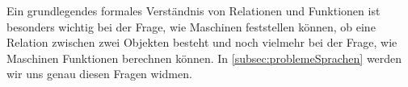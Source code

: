 Ein grundlegendes formales Verständnis von Relationen und Funktionen ist besonders wichtig
bei der Frage, wie Maschinen feststellen können,
ob eine Relation zwischen zwei Objekten besteht
und noch vielmehr bei der Frage, wie Maschinen Funktionen berechnen können.
In \autoref{subsec:problemeSprachen} werden wir uns genau diesen Fragen widmen.

